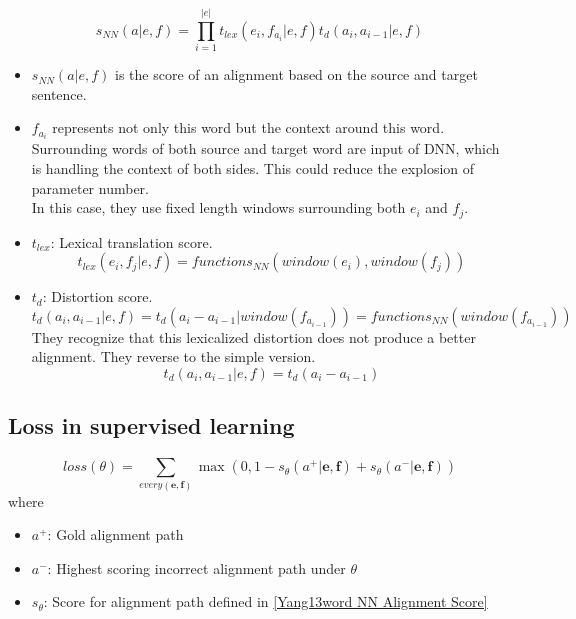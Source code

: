 \documentclass{article}
\begin{document}
\begin{equation}
s_{NN}(a|e, f) = \prod_{i = 1}^{|e|} t_{lex}(e_{i},f_{a_{i}}|e,f) t_{d}(a_{i},a_{i-1}|e,f)
\label{Yang13word NN Alignment Score}
\end{equation}

	\begin{itemize}
	\item $s_{NN}(a|e, f)$ is the score of an alignment based on the source and target sentence.
	\item $f_{a_{i}}$ represents not only this word but the context around this word. Surrounding words of both source and target word are input of DNN, which is handling the context of both sides. This could reduce the explosion of parameter number. \\ In this case, they use fixed length windows surrounding both $e_{i}$ and $f_{j}$. 
	\item $t_{lex}$: Lexical translation score.
	\begin{equation}
	t_{lex}(e_{i},f_{j}|e,f) = functions_{NN}(window(e_{i}),window(f_{j}) )
	\label{Yang13word Lexical Translation Score}
	\end{equation}
	\item $t_{d}$: Distortion score.
	\begin{equation}
	t_{d}(a_{i}, a_{i-1}|e,f) = t_{d}(a_{i} - a_{i-1}|window(f_{a_{i-1}})) = functions_{NN}(window(f_{a_{i-1}}))
	\end{equation}
	They recognize that this lexicalized distortion does not produce a better alignment. They reverse to the simple version.
	\begin{equation}
	t_{d}(a_{i}, a_{i-1}|e,f) = t_{d}(a_{i} - a_{i-1})
	\end{equation}
	\end{itemize}

\subsection{Loss in supervised learning}
\begin{equation}
loss(\theta) = \sum_{every(\textbf{e},\textbf{f})} \max(0 , 1 - s_{\theta}(a^+ |\textbf{e},\textbf{f}) + s_{\theta}(a^- |\textbf{e},\textbf{f}) )
\label{Yang13word Alignment Loss}
\end{equation}
where
\begin{itemize}
\item $a^+$: Gold alignment path
\item $a^-$: Highest scoring incorrect alignment path under $\theta$
\item $s_\theta$: Score for alignment path defined in \eqref{Yang13word NN Alignment Score}
\end{itemize}
\end{document}
